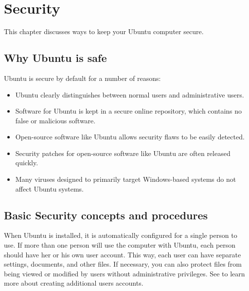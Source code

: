 

\chapter{Security}
\label{ch:security}

This chapter discusses ways to keep your Ubuntu computer secure.

\section{Why Ubuntu is safe}
\label{sec:security:why-ubuntu-is-safe}

Ubuntu is secure by default for a number of reasons:

\begin{itemize}
	\item Ubuntu clearly distinguishes between normal users and administrative users.
	\item Software for Ubuntu is kept in a secure online repository, which contains no false or malicious software.
	\item Open-source software like Ubuntu allows security flaws to be easily detected.
	\item Security patches for open-source software like Ubuntu are often released quickly.
	\item Many viruses designed to primarily target Windows-based systems do not affect Ubuntu systems.
\end{itemize}


\section{Basic Security concepts and procedures}
\label{sec:security:security-basics}


When Ubuntu is installed, it is automatically configured for a single person to use. If more than one person will use the computer with Ubuntu, each person should have her or his own user account. This way, each user can have separate settings, documents, and other files. If necessary, you can also protect files from being viewed or modified by users without administrative privileges. See  to learn more about creating additional users accounts.

